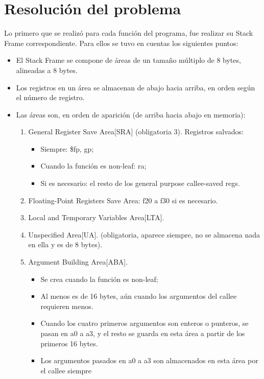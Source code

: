 \documentclass[a4paper,10pt]{article}
\begin{document}
\section{Resoluci\'on del problema}
  Lo primero que se realiz\'o para cada funci\'on del programa, fue realizar su Stack Frame correspondiente.
  Para ellos se tuvo en cuentas los siguientes puntos: 
  \begin{itemize}
    \item El Stack Frame se compone de \'areas de un tama\~no m\'ultiplo de 8 bytes, alineadas a 8 bytes.
    \item Los registros en un \'area se almacenan de abajo hacia arriba, en orden seg\'un el n\'umero de registro.
    \item Las \'areas son, en orden de aparici\'on (de arriba hacia abajo en memoria):
      \begin{enumerate}
	  \item General Register Save Area[SRA] (obligatoria 3). Registros salvados:
	    \begin{itemize}
	      \item Siempre: \$fp, gp;
	      \item Cuando la funci\'on es non-leaf: ra;
	      \item Si es necesario: el resto de los general purpose callee-saved regs.
	    \end{itemize}
	  \item Floating-Point Registers Save Area: f20 a f30 si es necesario.
	  \item Local and Temporary Variables Area[LTA].
	  \item Unspecified Area[UA]. (obligatoria, aparece siempre, no se almacena nada en ella y es de 8 bytes).
	  \item Argument Building Area[ABA].
	    \begin{itemize}
	      \item Se crea cuando la funci\'on es non-leaf;
	      \item Al menos es de 16 bytes, a\'un cuando los argumentos del callee requieren menos.
	      \item Cuando los cuatro primeros argumentos son enteros o punteros, se pasan en a0 a a3, y el resto se guarda en esta \'area a partir de los primeros 16 bytes.
	      \item Los argumentos pasados en a0 a a3 son almacenados en esta \'area por el callee siempre
	    \end{itemize}
      \end{enumerate}
  \end{itemize}
  
\end{document}
